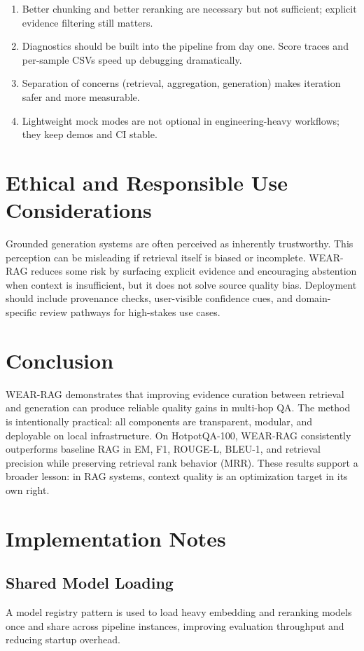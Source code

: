\documentclass[10pt,draftclsnofoot,onecolumn,journal]{IEEEtran}
\begin{document}
\begin{enumerate}
\item Better chunking and better reranking are necessary but not sufficient; explicit evidence filtering still matters.
\item Diagnostics should be built into the pipeline from day one. Score traces and per-sample CSVs speed up debugging dramatically.
\item Separation of concerns (retrieval, aggregation, generation) makes iteration safer and more measurable.
\item Lightweight mock modes are not optional in engineering-heavy workflows; they keep demos and CI stable.
\end{enumerate}

\section{Ethical and Responsible Use Considerations}
Grounded generation systems are often perceived as inherently trustworthy. This perception can be misleading if retrieval itself is biased or incomplete. WEAR-RAG reduces some risk by surfacing explicit evidence and encouraging abstention when context is insufficient, but it does not solve source quality bias. Deployment should include provenance checks, user-visible confidence cues, and domain-specific review pathways for high-stakes use cases.

\section{Conclusion}
WEAR-RAG demonstrates that improving evidence curation between retrieval and generation can produce reliable quality gains in multi-hop QA. The method is intentionally practical: all components are transparent, modular, and deployable on local infrastructure. On HotpotQA-100, WEAR-RAG consistently outperforms baseline RAG in EM, F1, ROUGE-L, BLEU-1, and retrieval precision while preserving retrieval rank behavior (MRR). These results support a broader lesson: in RAG systems, context quality is an optimization target in its own right.

\appendices

\section{Implementation Notes}
\subsection{Shared Model Loading}
A model registry pattern is used to load heavy embedding and reranking models once and share across pipeline instances, improving evaluation throughput and reducing startup overhead.
\end{document}
